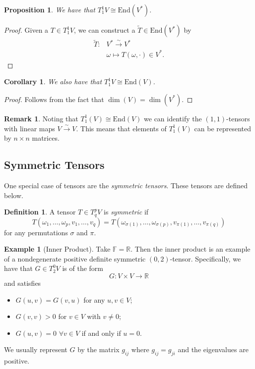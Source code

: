 \documentclass[12pt]{article}
\newcommand{\R}{\mathbb{R}}
\newcommand{\field}{\mathbb{F}}
\newcommand{\linmap}{\overset{\sim}{\longrightarrow}}
\newcommand{\End}{\mathrm{End}}
\newcommand{\tspace}{T_q^pV}
\newtheorem{proposition}{Proposition}[section]
\newtheorem{corollary}{Corollary}[section]
\theoremstyle{definition}
\newtheorem{definition}{Definition}[section]
\newtheorem{example}{Example}[section]
\newtheorem{remark}{Remark}[section]
\begin{document}
\begin{proposition}
We have that $T_1^1V\cong \End(V^*)$.
\end{proposition}
\begin{proof}
Given a $T\in T_1^1V$, we can construct a $\tilde{T}\in \End(V^*)$ by
\begin{align*}
\tilde{T}\colon& V^* \linmap V^*\\
&\omega \mapsto T(\omega,\cdot)\in V^*.
\end{align*}
\end{proof}

\begin{corollary}
We also have that $T_1^1V\cong \End(V)$.
\end{corollary}
\begin{proof}
Follows from the fact that $\dim(V)=\dim(V^*)$.
\end{proof}

\begin{remark}
Noting that $T_1^1(V)\cong \End(V)$ we can identify the $(1,1)$-tensors with linear maps $V\linmap V$.  This means that elements of $T_1^1(V)$ can be represented by $n\times n$ matrices.
\end{remark}

\subsection{Symmetric Tensors}
One special case of tensors are the \emph{symmetric tensors}.  These tensors are defined below.

\begin{definition}
A tensor $T\in \tspace$ is \emph{symmetric} if 
\[
T(\omega_1,\dots ,\omega_p,v_1,\dots,v_q)=T(\omega_{\sigma(1)},\dots,\omega_{\sigma(p)},v_{\pi(1)},\dots,v_{\pi(q)})
\]
for any permutations $\sigma$ and $\pi$.
\end{definition}

\begin{example}[Inner Product]
Take $\field=\R$. Then the inner product is an example of a nondegenerate positive definite symmetric $(0,2)$-tensor.  Specifically, we have that $G\in T_2^0V$ is of the form
\[
G\colon V\times V \to \R
\]
and satisfies
\begin{itemize}
    \item $G(u,v)=G(v,u)$ for any $u,v\in V$;
    \item $G(v,v)>0$ for $v\in V$ with $v\neq 0$;
    \item $G(u,v)=0$ $\forall v \in V$ if and only if $u=0$.
\end{itemize}
We usually represent $G$ by the matrix $g_{ij}$ where $g_{ij}=g_{ji}$ and the eigenvalues are positive.
\end{example}
\end{document}
